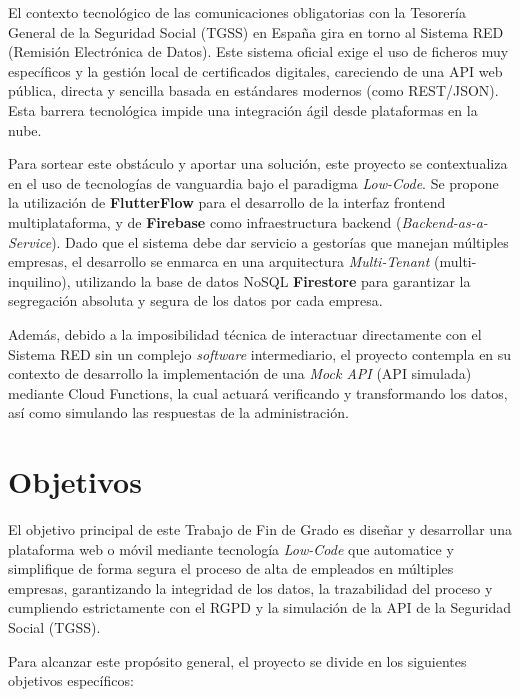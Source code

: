 El contexto tecnológico de las comunicaciones obligatorias con la Tesorería General de la Seguridad Social (TGSS) en España gira en torno al Sistema RED (Remisión Electrónica de Datos). Este sistema oficial exige el uso de ficheros muy específicos y la gestión local de certificados digitales, careciendo de una API web pública, directa y sencilla basada en estándares modernos (como REST/JSON). Esta barrera tecnológica impide una integración ágil desde plataformas en la nube. 

Para sortear este obstáculo y aportar una solución, este proyecto se contextualiza en el uso de tecnologías de vanguardia bajo el paradigma \textit{Low-Code}. Se propone la utilización de \textbf{FlutterFlow} para el desarrollo de la interfaz frontend multiplataforma, y de \textbf{Firebase} como infraestructura backend (\textit{Backend-as-a-Service}). Dado que el sistema debe dar servicio a gestorías que manejan múltiples empresas, el desarrollo se enmarca en una arquitectura \textit{Multi-Tenant} (multi-inquilino), utilizando la base de datos NoSQL \textbf{Firestore} para garantizar la segregación absoluta y segura de los datos por cada empresa. 

Además, debido a la imposibilidad técnica de interactuar directamente con el Sistema RED sin un complejo \textit{software} intermediario, el proyecto contempla en su contexto de desarrollo la implementación de una \textit{Mock API} (API simulada) mediante Cloud Functions, la cual actuará verificando y transformando los datos, así como simulando las respuestas de la administración.


\section{Objetivos} \label{sct:intro:objetivos}

El objetivo principal de este Trabajo de Fin de Grado es diseñar y desarrollar una plataforma web o móvil mediante tecnología \textit{Low-Code} que automatice y simplifique de forma segura el proceso de alta de empleados en múltiples empresas, garantizando la integridad de los datos, la trazabilidad del proceso y cumpliendo estrictamente con el RGPD y la simulación de la API de la Seguridad Social (TGSS).

Para alcanzar este propósito general, el proyecto se divide en los siguientes objetivos específicos:

